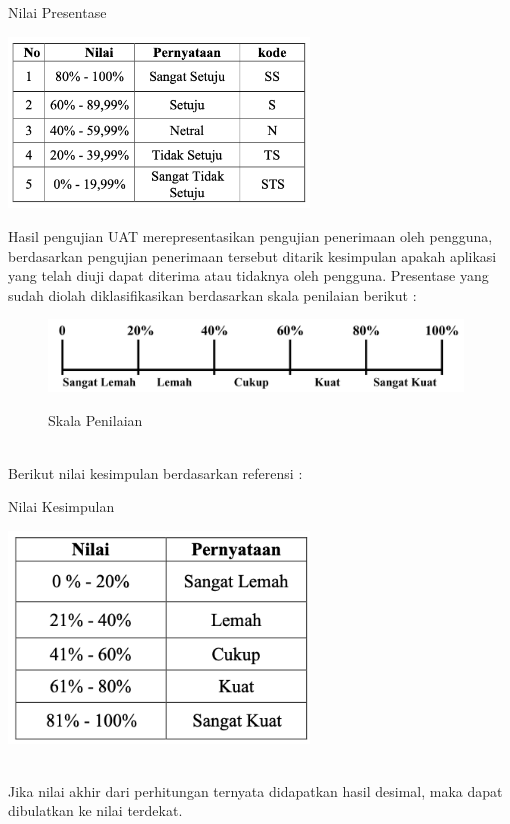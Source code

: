 \begin{flushleft}
\begin{justify}
         \begin{table}[ht]
            \centering
            \caption{Nilai Presentase}
            \includegraphics[width=8cm]{images/bab 3/table presentase.png}\\
            \end{table}
         \noindent Hasil pengujian UAT merepresentasikan pengujian penerimaan oleh pengguna, berdasarkan pengujian penerimaan tersebut ditarik kesimpulan apakah aplikasi yang telah diuji dapat diterima atau tidaknya oleh pengguna. Presentase yang sudah diolah diklasifikasikan berdasarkan skala penilaian berikut \cite{kuantitatif} : 
         \begin{figure}[ht]
            \centering
            \includegraphics[width=11cm]{images/bab 3/skala.png}\\
            \caption{Skala Penilaian}
        \end{figure}
        \noindent \\Berikut nilai kesimpulan berdasarkan referensi \cite{kuantitatif} :
        \begin{table}[ht]
         \centering
         \caption{Nilai Kesimpulan}
         \includegraphics[width=8cm]{images/bab 3/Kesimpulan.png}\\
         \end{table}
         \noindent \\Jika nilai akhir dari perhitungan ternyata didapatkan hasil desimal, maka dapat dibulatkan ke nilai terdekat.\\
      

\end{justify}
\end{flushleft}
